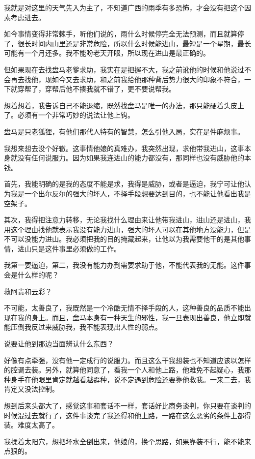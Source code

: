 我就是对这里的天气先入为主了，不知道广西的雨季有多恐怖，才会没有把这个因素考虑进去。

如今事情变得非常棘手，听他们说的，雨什么时候停完全无法预测，而且就算停了，很长时间内山里还是非常危险，所以什么时候能进山，最短是一个星期，最长可能有一个月还多。我不能盼老天开眼，所以现在进山是最正确的。

但如果现在去找盘马老爹求助，我实在是把握不大，我之前讹他的时候和他说过不会再去找他，现如今又去求助，和之前我给他那种背后势力很大的印象不符合，一下就穿帮了，穿帮后他不揍我就不错了，更不要说帮我。

想着想着，我告诉自己不能退缩，既然找盘马是唯一的办法，那只能硬着头皮上了。必须有一个非常巧妙的说法让他上钩。

盘马是只老狐狸，有他们那代人特有的智慧，怎么引他入局，实在是件麻烦事。

我想来想去没个好辙。这事情他娘的真难办，我突然出现，求他带我进山，这事本身就没有任何说服力。因为如果我连进山的能力都没有，那同样也没有威胁他的本钱。

首先，我能明确的是我的态度不能是求，我得是威胁，或者是逼迫，我宁可让他认为我是一个出尔反尔的强大的坏人，不择手段想要达到目的，也不能让他看出我是空架子。

其次，我得把注意力转移，无论我找什么理由来让他带我进山，进山还是进山，我用这个理由找他就表示我没有能力进山，强大的坏人可以在其他地方没能力，但是不可以没能力进山。我必须把我的目的掩藏起来，让他以为我需要他干的是其他事情，进山只是这件事里必须做的工作。

我第一要逼迫，第二，我没有能力办到需要求助于他，不能代表我的无能。这件事会是什么样的呢？

救阿贵和云彩？

不可能，太善良了，我既然是一个冷酷无情不择手段的人，这种善良的品质不能出现在我的身上。而且，盘马本身有一种天生的邪性，我一旦表现出善良，他立即就能压倒我反过来威胁我，我不能表现出人性的弱点。

说要让他到那边当面辨认什么东西？

好像有点牵强，没有他一定成行的说服力。而且这么干我想装也不知道应该以怎样的腔调去装。另外，就算他同意了，看我一个人和他上路，他难免不起疑心，我那种身手在他眼里肯定就越看越孬种，说不定遇到危险还要靠他救我。一来二去，我肯定又没法控制。

想到后来头都大了，感觉这事和套话不一样，套话好比商务谈判，你只要在谈判的时候混过去就行了，这件事谈完了我还得和他上路，一路在这么恶劣的条件上都得装。难度太高了。

我揉着太阳穴，想把坏水全倒出来，他娘的，换个思路，如果靠装不行，能不能来点狠的。


